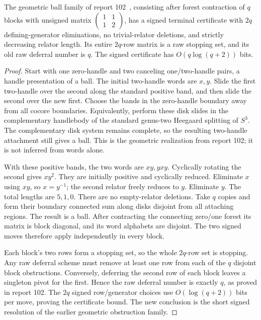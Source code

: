 \begin{corollary}
\label{cor:linear-deferral-resolved}
The geometric ball family of report 102~\cite{Report102}, consisting after forest
contraction of $q$ blocks with unsigned matrix
$\left(\begin{smallmatrix}1&1\\1&2\end{smallmatrix}\right)$, has a
signed terminal certificate with $2q$ defining-generator eliminations,
no trivial-relator deletions, and strictly decreasing relator length.
Its entire $2q$-row matrix is a raw stopping set, and its old raw
deferral number is $q$.  The signed certificate has
$O(q\log(q+2))$ bits.
\end{corollary}
\begin{proof}
Start with one zero-handle and two canceling one/two-handle pairs, a
handle presentation of a ball.  The initial two-handle words are $x,y$.
Slide the first two-handle over the second along the standard positive
band, and then slide the second over the new first.  Choose the bands
in the zero-handle boundary away from all cocore boundaries.  Equivalently,
perform these disk slides in the complementary handlebody of the
standard genus-two Heegaard splitting of $S^3$.  The complementary
disk system remains complete, so the resulting two-handle attachment
still gives a ball.  This is the geometric realization from report 102;
it is not inferred from words alone.

With these positive bands, the two words are $xy,yxy$.  Cyclically
rotating the second gives $xy^2$.  They are initially positive and
cyclically reduced.  Eliminate $x$ using $xy$, so
$x=y^{-1}$; the second relator freely reduces to $y$.  Eliminate $y$.
The total lengths are $5,1,0$.  There are no empty-relator deletions.
Take $q$ copies and form their boundary connected sum along disks
disjoint from all attaching regions.  The result is a ball.  After
contracting the connecting zero/one forest its matrix is block diagonal,
and its word alphabets are disjoint.  The two signed moves therefore
apply independently in every block.

Each block's two rows form a stopping set, so the whole $2q$-row set is
stopping.  Any raw deferral scheme must remove at least one row from
each of the $q$ disjoint block obstructions.  Conversely, deferring the
second row of each block leaves a singleton pivot for the first.  Hence
the raw deferral number is exactly $q$, as proved in report 102.
The $2q$ signed row/generator choices use $O(\log(q+2))$ bits per move,
proving the certificate bound.  The new conclusion is the short signed
resolution of the earlier geometric obstruction family.
\end{proof}

